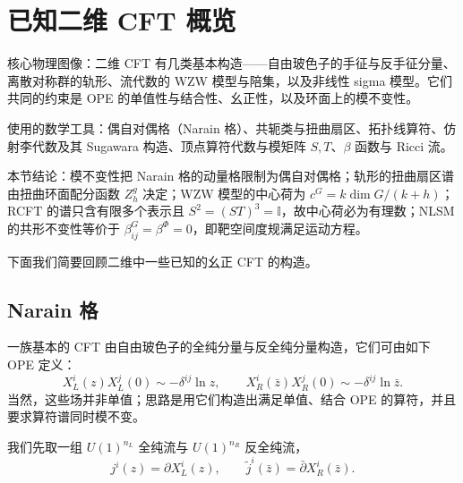 \section{已知二维 CFT 概览}\label{sec:4}

\begin{keytakeaways}
  \item 核心物理图像：二维 CFT 有几类基本构造——自由玻色子的手征与反手征分量、离散对称群的轨形、流代数的 WZW 模型与陪集，以及非线性 sigma 模型。它们共同的约束是 OPE 的单值性与结合性、幺正性，以及环面上的模不变性。
  \item 使用的数学工具：偶自对偶格（Narain 格）、共轭类与扭曲扇区、拓扑线算符、仿射李代数及其 Sugawara 构造、顶点算符代数与模矩阵 $S,T$、$\beta$ 函数与 Ricci 流。
  \item 本节结论：模不变性把 Narain 格的动量格限制为偶自对偶格；轨形的扭曲扇区谱由扭曲环面配分函数 $Z^g_h$ 决定；WZW 模型的中心荷为 $c^G=k\dim G/(k+h)$；RCFT 的谱只含有限多个表示且 $S^2=(ST)^3=\mathbb{I}$，故中心荷必为有理数；NLSM 的共形不变性等价于 $\beta^G_{ij}=\beta^\Phi=0$，即靶空间度规满足运动方程。
\end{keytakeaways}

下面我们简要回顾二维中一些已知的幺正 CFT 的构造。

\subsection{Narain 格}\label{sec:4-1}

一族基本的 CFT 由自由玻色子的全纯分量与反全纯分量构造，它们可由如下 OPE 定义：
\begin{equation}
  \label{eq:4-1}
  X_L^i(z)X_L^j(0)\sim-\delta^{ij}\ln z,\qquad X_R^i(\bar z)X_R^j(0)\sim-\delta^{ij}\ln\bar z .
\end{equation}
当然，这些场并非单值；思路是用它们构造出满足单值、结合 OPE 的算符，并且要求算符谱同时模不变。


我们先取一组 $U(1)^{n_L}$ 全纯流与 $U(1)^{n_R}$ 反全纯流，
\begin{equation}
  \label{eq:4-2}
  j^i(z)=\partial X_L^i(z),\qquad \tilde j^i(\bar z)=\bar\partial X_R^i(\bar z).
\end{equation}

